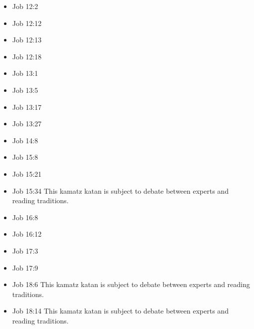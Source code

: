 \documentclass[14pt]{article}
\begin{document}
\begin{multicols}{2}
\begin{itemize}
											\item Job 12:2
											
											\item Job 12:12
											
											\item Job 12:13
											
											\item Job 12:18
											
											\item Job 13:1
											
											\item Job 13:5
											
											\item Job 13:17
											
											\item Job 13:27
											
											\item Job 14:8
											
											\item Job 15:8
											
											\item Job 15:21
											
											\item Job 15:34 This kamatz katan is subject to debate between experts and reading traditions.
											
											\item Job 16:8
													
													\item Job 16:12
													
													\item Job 17:3
													
													\item Job 17:9
															
															\item Job 18:6 This kamatz katan is subject to debate between experts and reading traditions.
															
															\item Job 18:14 This kamatz katan is subject to debate between experts and reading traditions.
															

\end{itemize}
\end{multicols}
\end{document}
